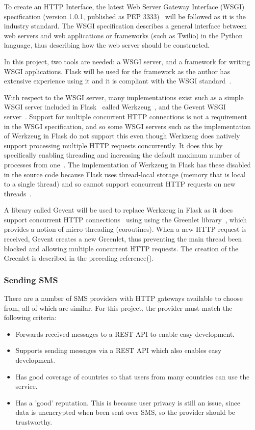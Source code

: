 \documentclass[authoryearcitations]{UoYCSproject}
\begin{document}
To create an HTTP Interface, the latest Web Server Gateway Interface (WSGI) specification (version 1.0.1, published as PEP 3333)~\cite{eby2010python} will be followed as it is the industry standard. The WSGI specification describes a general interface between web servers and web applications or frameworks (such as Twilio) in the Python language, thus describing how the web server should be constructed.

In this project, two tools are needed: a WSGI server, and a framework for writing WSGI applications. Flask will be used for the framework as the author has extensive experience using it and it is compliant with the WSGI standard~\cite{libraryFlask}.

With respect to the WSGI server, many implementations exist such as a simple WSGI server included in Flask~\cite{libraryFlask} called Werkzeug~\cite{libraryWerkzeug}, and the Gevent WSGI server~\cite{libraryGevent}.  Support for multiple concurrent HTTP connections is not a requirement in the WSGI specification, and so some WSGI servers such as the implementation of Werkzeug in Flask do not support this even though Werkzeug does natively support processing multiple HTTP requests concurrently. It does this by specifically enabling threading and increasing the default maximum number of processes from one~\cite{werkzeugThreading}. The implementation of Werkzeug in Flask has these disabled in the source code because Flask uses thread-local storage (memory that is local to a single thread) and so cannot support concurrent HTTP requests on new threads~\cite{flaskThreading}.

A library called Gevent will be used to replace Werkzeug in Flask as it does support concurrent HTTP connections~\cite{geventImplementingServers} using using the Greenlet library~\cite{libraryGreenlet}, which provides a notion of micro-threading (coroutines). When a new HTTP request is received, Gevent creates a new Greenlet, thus preventing the main thread been blocked and allowing multiple concurrent HTTP requests. The creation of the Greenlet is described in the preceding reference(\cite{geventImplementingServers}). 

\subsubsection{Sending SMS}
There are a number of SMS providers with HTTP gateways available to choose from, all of which are similar. For this project, the provider must match the following criteria:
\begin{itemize}
  \item Forwards received messages to a REST API to enable easy development.
  \item Supports sending messages via a REST API which also enables easy development.
  \item Has good coverage of countries so that users from many countries can use the service.
  \item Has a 'good' reputation. This is because user privacy is still an issue, since data is unencrypted when been sent over SMS, so the provider should be trustworthy.
\end{itemize}
\end{document}
